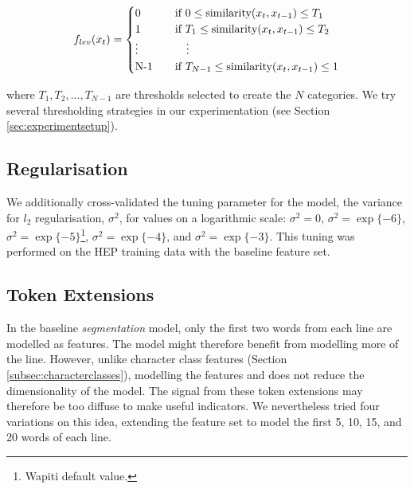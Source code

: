 \begin{equation}
  f_{lev}(x_t) =
  \begin{cases}
  	0 & \quad \text{if } 0 \leq \text{similarity}(x_t, x_{t-1}) \leq T_1 \\
	1 & \quad \text{if } T_1 \leq \text{similarity}(x_t, x_{t-1}) \leq T_2\\
	\vdots & \qquad \vdots \\
	$N-1$ & \quad \text{if } T_{N-1} \leq \text{similarity}(x_t, x_{t-1}) \leq 1 \\
  \end{cases}
\label{eq:levenshteinfunction}
\end{equation}

where $T_1, T_2, ..., T_{N-1}$ are thresholds selected to create the $N$ categories. We try several thresholding strategies in our experimentation (see Section \ref{sec:experimentsetup}).

\subsection{Regularisation}

We additionally cross-validated the tuning parameter for the model, the variance for $l_2$ regularisation, $\sigma^2$, for values on a logarithmic scale: $\sigma^2 = 0$, $\sigma^2 = \exp\{-6\}$, $\sigma^2 = \exp\{-5\}$\footnote{Wapiti default value.}, $\sigma^2 = \exp\{-4\}$, and $\sigma^2 = \exp\{-3\}$. This tuning was performed on the HEP training data with the baseline feature set.

\subsection{Token Extensions}

In the baseline \emph{segmentation} model, only the first two words from each line are modelled as features. The model might therefore benefit from modelling more of the line. However, unlike character class features (Section \ref{subsec:characterclasses}), modelling the features and does not reduce the dimensionality of the model. The signal from these token extensions may therefore be too diffuse to make useful indicators. We nevertheless tried four variations on this idea, extending the feature set to model the first 5, 10, 15, and 20 words of each line.
